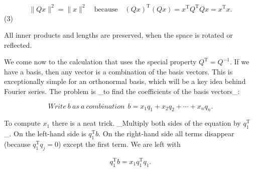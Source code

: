 \[\|Qx\|^{2}=\|x\|^{2}\quad\mathrm{because}\quad(Qx)^{\mathrm{T}}(Qx)=x^{ \mathrm{T}}Q^{\mathrm{T}}Qx=x^{\mathrm{T}}x.\] (3)

All inner products and lengths are preserved, when the space is rotated or reflected.

We come now to the calculation that uses the special property \(Q^{\mathrm{T}}=Q^{-1}\). If we have a basis, then any vector is a combination of the basis vectors. This is exceptionally simple for an orthonormal basis, which will be a key idea behind Fourier series. The problem is _to find the coefficients of the basis vectors_:

\[\boxed{Write\ b\ as\ a\ combination\ \ b=x_{1}q_{1}+x_{2}q_{2}+\cdots+x_{n}q_{n}.}\]

To compute \(x_{1}\) there is a neat trick. _Multiply both sides of the equation by \(q_{1}^{\mathrm{T}}\)_. On the left-hand side is \(q_{1}^{\mathrm{T}}b\). On the right-hand side all terms disappear (because \(q_{1}^{\mathrm{T}}q_{j}=0\)) except the first term. We are left with

\[q_{1}^{\mathrm{T}}b=x_{1}q_{1}^{\mathrm{T}}q_{1}.\] 